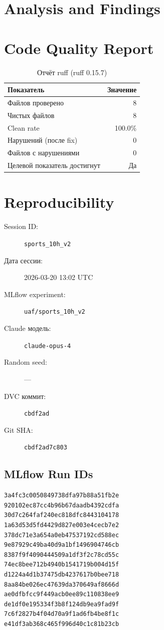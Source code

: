 \documentclass[12pt,a4paper]{article}
\begin{document}
\section{Analysis and Findings}









\section{Code Quality Report}

\begin{table}[H]
\centering
\caption{Отчёт ruff (ruff 0.15.7)}
\begin{tabular}{lr}
\toprule
Показатель & Значение \\
\midrule
Файлов проверено & 8 \\
Чистых файлов & 8 \\
Clean rate & \textcolor{passcolor}{100.0\%} \\
Нарушений (после fix) & \textcolor{passcolor}{0} \\
Файлов с нарушениями & 0 \\
Целевой показатель достигнут & \textcolor{passcolor}{Да} \\
\bottomrule
\end{tabular}
\end{table}





\section{Reproducibility}

\begin{description}
    \item[Session ID:] \texttt{sports\_10h\_v2}
    \item[Дата сессии:] 2026-03-20 13:02 UTC
    \item[MLflow experiment:] \texttt{uaf/sports\_10h\_v2}
    \item[Claude модель:] \texttt{claude-opus-4}
    \item[Random seed:] ---
    \item[DVC коммит:] \texttt{cbdf2ad}
    \item[Git SHA:] \texttt{cbdf2ad7c803}
\end{description}

\subsection*{MLflow Run IDs}

\begin{lstlisting}
3a4fc3c0050849738dfa97b88a51fb2e
920102ec87cc4b96b67daadb4392cdfa
30d7c264faf240ec818dfc8443104178
1a63d53d5fd4429d827e003e4cecb7e2
378dc71e3a654a0eb47537192cd588ec
9e87929c49ba40d9a1bf1496904746cb
8387f9f4090444509a1df3f2c78cd55c
74ec8bee712b4940b1541719b004d15f
d1224a4d1b37475db4237617b0bee718
8aa84be026ec47639da370649af8666d
ae0dfbfcc9f449acb0ee89c110838ee9
de1df0e195334f3b8f124db9ea9fad9f
7c6f2827b4f04d70a9f1ad6fb4be8f1c
e41df3ab368c465f996d40c1c81b23cb
\end{lstlisting}
\end{document}
